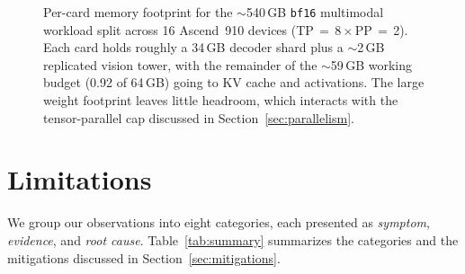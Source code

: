 \documentclass{article}
\newcommand{\code}[1]{\texttt{#1}}
\begin{document}
\begin{figure}[t]
\centering
{}
\caption{Per-card memory footprint for the $\sim$540\,GB \code{bf16} multimodal
workload split across 16 Ascend~910 devices (TP\,$=$\,8\,$\times$\,PP\,$=$\,2).
Each card holds roughly a 34\,GB decoder shard plus a $\sim$2\,GB replicated
vision tower, with the remainder of the $\sim$59\,GB working budget
(0.92 of 64\,GB) going to KV cache and activations. The large weight footprint
leaves little headroom, which interacts with the tensor-parallel cap discussed in
Section~\ref{sec:parallelism}.}
\label{fig:memory}
\end{figure}

\section{Limitations}
\label{sec:limitations}
We group our observations into eight categories, each presented as
\emph{symptom}, \emph{evidence}, and \emph{root cause}. Table~\ref{tab:summary}
summarizes the categories and the mitigations discussed in
Section~\ref{sec:mitigations}.
\end{document}
